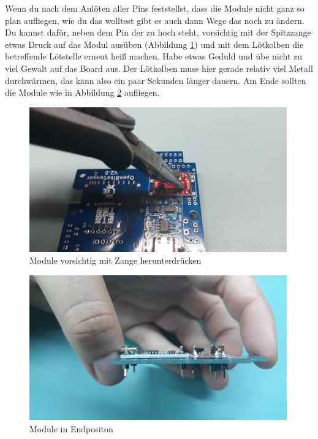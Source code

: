 \documentclass[12pt, a4paper]{article}		%
\begin{document}
Wenn du nach dem Anlöten aller Pins feststellst, dass die Module nicht ganz so plan aufliegen, wie du das wolltest gibt es auch dann Wege das noch zu ändern. Du kannst dafür, neben dem Pin der zu hoch steht, vorsichtig mit der Spitzzange etwas Druck auf das Modul ausüben (Abbildung \ref{fig:20200726_123429}) und mit dem Lötkolben die betreffende Lötstelle erneut heiß machen. Habe etwas Geduld und übe nicht zu viel Gewalt auf das Board aus. Der Lötkolben muss hier gerade relativ viel Metall durchwärmen, das kann also ein paar Sekunden länger dauern. Am Ende sollten die Module wie in Abbildung \ref{fig:20200726_123438} aufliegen.

\begin{minipage}[t]{0.49\textwidth}
\begin{figure}[H]
	\centering
		\includegraphics[width=0.99\textwidth]{Grafiken/20200726_123429.jpg}
	\caption{Module vorsichtig mit Zange herunterdrücken}
	\label{fig:20200726_123429}
\end{figure}
\end{minipage}
\begin{minipage}[t]{0.49\textwidth}
\begin{figure}[H]
	\centering
		\includegraphics[width=0.99\textwidth]{Grafiken/20200726_123438.jpg}
	\caption{Module in Endpositon}
	\label{fig:20200726_123438}
\end{figure}
\end{minipage}
\end{document}
